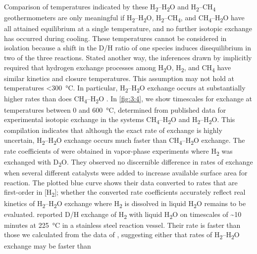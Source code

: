 Comparison of temperatures indicated by these
H\textsubscript{2}--H\textsubscript{2}O and
H\textsubscript{2}--CH\textsubscript{4} geothermometers are only
meaningful if H\textsubscript{2}--H\textsubscript{2}O,
H\textsubscript{2}--CH\textsubscript{4}, and
CH\textsubscript{4}--H\textsubscript{2}O have all attained equilibrium
at a single temperature, and no further isotopic exchange has occurred
during cooling. These temperatures cannot be considered in isolation
because a shift in the D/H ratio of one species induces disequilibrium
in two of the three reactions. Stated another way, the inferences drawn
by \textcite{Proskurowski++_2006_CG} implicitly required that hydrogen exchange
processes among H\textsubscript{2}O, H\textsubscript{2}, and
CH\textsubscript{4} have similar kinetics and closure temperatures.
This assumption may not hold at temperatures \textless{}300~°C. In
particular, H\textsubscript{2}--H\textsubscript{2}O exchange occurs at
substantially higher rates than does
CH\textsubscript{4}--H\textsubscript{2}O \parencite{Lyon+Hulston_1984_GCA,Lecluse+Robert_1994_GCA,Horibe+Craig_1995_GCA}. In \autoref{fig:3:4}, we show
timescales for exchange at temperatures between 0 and 600~°C, determined
from published data for experimental isotopic exchange in the systems
CH\textsubscript{4}--H\textsubscript{2}O and
H\textsubscript{2}--H\textsubscript{2}O. This compilation indicates that
although the exact rate of exchange is highly uncertain,
H\textsubscript{2}--H\textsubscript{2}O exchange occurs much faster than
CH\textsubscript{4}--H\textsubscript{2}O exchange. The rate coefficients
of \textcite{Lecluse+Robert_1994_GCA} were obtained in vapor-phase experiments
where H\textsubscript{2} was exchanged with D\textsubscript{2}O. They
observed no discernible difference in rates of exchange when several
different catalysts were added to increase available surface area for
reaction. The plotted blue curve shows their data converted to rates
that are first-order in {[}H\textsubscript{2}{]}; whether the converted
rate coefficients accurately reflect real kinetics of
H\textsubscript{2}--H\textsubscript{2}O exchange where
H\textsubscript{2} is dissolved in liquid H\textsubscript{2}O remains to
be evaluated. \textcite{Lyon+Hulston_1984_GCA} reported D/H exchange of
H\textsubscript{2} with liquid H\textsubscript{2}O on timescales of
\textasciitilde{}10 minutes at 225~°C in a stainless steel reaction
vessel. Their rate is faster than those we calculated from the data of
\textcite{Lecluse+Robert_1994_GCA}, suggesting either that rates of
H\textsubscript{2}--H\textsubscript{2}O exchange may be faster than
